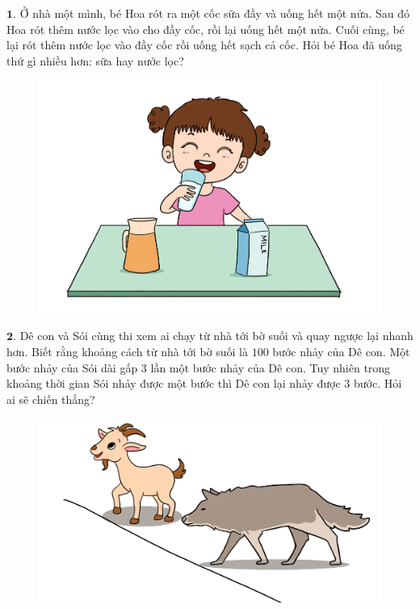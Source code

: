 \begin{multicols}{2}
	$\pmb{1.}$ Ở nhà một mình, bé Hoa rót ra một cốc sữa đầy và uống hết một nửa. Sau đó Hoa rót thêm nước lọc vào cho đầy cốc, rồi lại uống hết một nửa. Cuối cùng, bé lại rót thêm nước lọc vào đầy cốc rồi uống hết sạch cả cốc. Hỏi bé Hoa đã uống thứ gì nhiều hơn: sữa hay nước lọc?
	\begin{figure}[H]
		\centering
		\vspace*{-5pt}
		\captionsetup{labelformat= empty, justification=centering}
		\includegraphics[width=0.9\linewidth]{Pi6_bai1}
		\vspace*{-5pt}
	\end{figure}
	$\pmb{2.}$ Dê con và Sói cùng thi xem ai chạy từ nhà tới bờ suối và quay ngược lại nhanh hơn. Biết rằng khoảng cách từ nhà tới bờ suối là $100$ bước nhảy của Dê con. Một bước nhảy của Sói dài gấp $3$ lần một bước nhảy của Dê con. Tuy nhiên trong khoảng thời gian Sói nhảy được một bước thì Dê con lại nhảy được $3$ bước. Hỏi ai sẽ chiến thắng?
	\begin{figure}[H]
		\centering
		\vspace*{-5pt}
		\captionsetup{labelformat= empty, justification=centering}
		\includegraphics[width=0.95\linewidth]{Pi6_bai2}

\end{figure}
\end{multicols}
